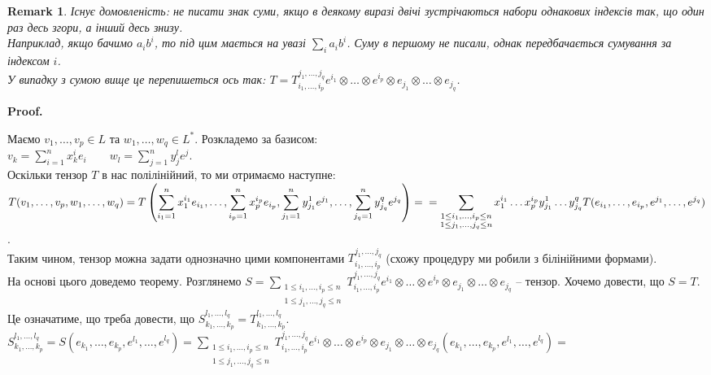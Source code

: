 \documentclass[a4paper, 10pt]{article}
\makeatletter
\theoremstyle{theoremdd}
\newtheorem{remark}[theorem]{Remark}
\renewenvironment{proof}[1][Proof.\\]{\par
\pushQED{\hfill \qed}%
\normalfont \topsep6\p@\@plus6\p@\relax
\trivlist
\item\relax
{\bfseries
#1\@addpunct{.}}\hspace\labelsep\ignorespaces
}{%
\popQED\endtrivlist\@endpefalse
}
\makeatother
\begin{document}
\begin{remark}
Існує домовленість: \textit{не писати знак суми}, якщо в деякому виразі двічі зустрічаються набори однакових індексів так, що один раз десь згори, а інший десь знизу.\\
Наприклад, якщо бачимо $a_i b^i$, то під цим мається на увазі $\displaystyle\sum_i a_i b^i$. Суму в першому не писали, однак передбачається сумування за індексом $i$.\\
У випадку з сумою вище це перепишеться ось так: $T = T_{i_1,\dots,i_p}^{j_1,\dots,j_q} e^{i_1} \otimes \dots \otimes e^{i_p} \otimes e_{j_1} \otimes \dots \otimes e_{j_q}$.
\end{remark}

\begin{proof}
Маємо $v_1,\dots,v_p \in L$ та $w_1,\dots,w_q \in L^*$. Розкладемо за базисом:\\
$v_k = \displaystyle\sum_{i=1}^n x_k^i e_i \qquad w_l = \sum_{j=1}^n y_j^l e^j$.\\
Оскільки тензор $T$ в нас полілінійний, то ми отримаємо наступне:\\
$T(v_1,\dots,v_p,w_1,\dots,w_q) = \displaystyle T\left( \sum_{i_1=1}^n x_1^{i_1} e_{i_1}, \dots, \sum_{i_p=1}^n x_p^{i_p} e_{i_p}, \sum_{j_1=1}^n y_{j_1}^1 e^{j_1},\dots, \sum_{j_q=1}^n y_{j_q}^q e^{j_q} \right) = \\
= \sum_{\substack{1 \leq i_1,\dots,i_p \leq n \\ 1 \leq j_1, \dots, j_q \leq n}} x_1^{i_1} \dots x_p^{i_p} y_{j_1}^1 \dots y_{j_q}^q T(e_{i_1},\dots,e_{i_p},e^{j_1},\dots,e^{j_q})$.\\
Таким чином, тензор можна задати однозначно цими компонентами $T_{i_1,\dots,i_p}^{j_1,\dots,j_q}$ (схожу процедуру ми робили з білінійними формами).
\bigskip \\
На основі цього доведемо теорему. Розглянемо $S = \displaystyle\sum_{\substack{1 \leq i_1,\dots,i_p \leq n \\ 1 \leq j_1,\dots,j_q \leq n}} T_{i_1,\dots,i_p}^{j_1,\dots,j_q} e^{i_1} \otimes \dots \otimes e^{i_p} \otimes e_{j_1} \otimes \dots \otimes e_{j_q}$ -- тензор. Хочемо довести, що $S = T$. Це означатиме, що треба довести, що $S_{k_1,\dots,k_p}^{l_1,\dots,l_q} = T_{k_1,\dots,k_p}^{l_1,\dots,l_q}$.\\
$S_{k_1,\dots,k_p}^{l_1,\dots,l_q} = S(e_{k_1},\dots,e_{k_p},e^{l_1},\dots,e^{l_q}) = \displaystyle\sum_{\substack{1 \leq i_1,\dots,i_p \leq n \\ 1 \leq j_1,\dots,j_q \leq n}} T_{i_1,\dots,i_p}^{j_1,\dots,j_q} e^{i_1} \otimes \dots \otimes e^{i_p} \otimes e_{j_1} \otimes \dots \otimes e_{j_q} (e_{k_1},\dots,e_{k_p},e^{l_1},\dots,e^{l_q}) \boxed{=}$\\

\end{proof}
\end{document}
